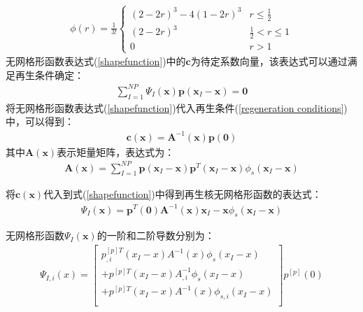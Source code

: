 \begin{equation}
\begin{split}
    \phi(r)=\frac{1}{3!}
\begin{cases}
    (2-2r)^3-4(1-2r)^3 &r\le \frac{1}{2}\\
    (2-2r)^3&\frac{1}{2}<r\le 1\\
    0&r>1
\end{cases}
\end{split}
\end{equation}
无网格形函数表达式(\ref{shapefunction})中的$\pmb{c}$为待定系数向量，该表达式可以通过满足再生条件确定：
\begin{equation}\label{regeneration conditions}
\begin{split}
    \sum_{I=1}^{N\!P}\Psi_I(\pmb{x})\pmb{p}(\pmb{x}_I-\pmb{x})=\pmb{0}
\end{split}
\end{equation}
将无网格形函数表达式(\ref{shapefunction})代入再生条件(\ref{regeneration conditions})中，可以得到：
\begin{equation}
\begin{split}
    \pmb{c}(\pmb{x})=\pmb{A}^{-1}(\pmb{x})\pmb{p}(\pmb{0})
\end{split}
\end{equation}
其中$\pmb{A}(\pmb{x})$表示矩量矩阵，表达式为：
\begin{equation}
\begin{split}
    \pmb{A}(\pmb{x})=\sum_{I=1}^{N\!P}\pmb{p}(\pmb{x}_I-\pmb{x})\pmb{p}^T(\pmb{x}_I-\pmb{x})\phi_s(\pmb{x}_I-\pmb{x})
\end{split}
\end{equation}\par
将$\pmb{c}(\pmb{x})$代入到式(\ref{shapefunction})中得到再生核无网格形函数的表达式：
\begin{equation}
\begin{split}
    \Psi_I(\pmb{x})=\pmb{p}^T(\pmb{0})\pmb{A}^{-1}(\pmb{x})\pmb{x}_I-\pmb{x}\phi_s(\pmb{x}_I-\pmb{x})
\end{split}
\end{equation}\par
无网格形函数$\Psi_I(\pmb{x})$的一阶和二阶导数分别为：
\begin{equation}
\begin{split}
    \Psi_{I,i}(x)=\left[\begin{matrix}
    p_{,i}^{[p]T}(x_I-x)A^{-1}(x)\phi_s(x_I-x)\\
    +p^{[p]T}(x_I-x)A_{,i}^{-1}\phi_s(x_I-x)\\
    +p^{[p]T}(x_I-x)A^{-1}(x)\phi _{s,i}(x_I-x)\\
    \end{matrix}\right]
    p^{[p]}(0)
\end{split}
\end{equation}
